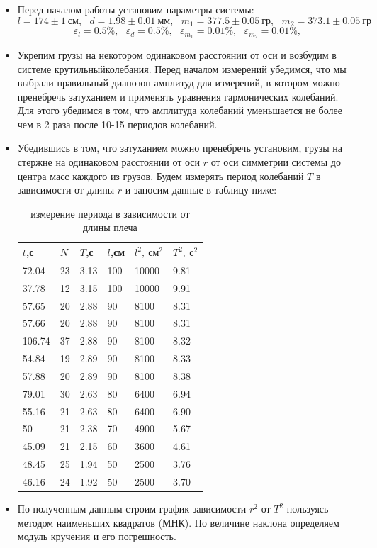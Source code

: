 \documentclass[a4paper,12pt]{article} %
\begin{document}
\begin{itemize}
    \item Перед началом работы установим параметры системы:
$$l=174 \pm 1 \ \text{см},\ \ \ d = 1.98 \pm 0.01 \ \text{мм}, \ \ \ m_1=377.5 \pm 0.05 \ \text{гр}, \ \ \ m_2= 373.1 \pm 0.05 \ \text{гр} $$
$$\varepsilon_{l}=0.5 \%, \ \ \ \varepsilon_{d}= 0.5 \%,\ \ \ \varepsilon_{m_1}=0.01 \%,\ \ \ \varepsilon_{m_2}= 0.01\%,$$
    \item Укрепим грузы на некотором одинаковом расстоянии от оси и возбудим в системе крутильныйколебания. Перед 
началом измерений убедимся, что мы выбрали правильный диапозон амплитуд для измерений,
в котором можно пренебречь затуханием и применять уравнения гармонических колебаний. Для 
этого убедимся в том, что амплитуда колебаний уменьшается не более чем в 2 раза после 10-15 периодов
колебаний.
    \item Убедившись в том, что затуханием можно пренебречь установим, грузы на стержне на одинаковом расстоянии от оси $r$
от оси симметрии системы до центра масс каждого из грузов. Будем измерять период колебаний $T$ в зависимости
от длины $r$ и заносим данные в таблицу ниже:
\begin{table}[!ht]
    \centering
    \begin{tabular}{llllll}\hline
        $t$,с&$N$&$T$,с&$l$,см&$l^2,\ \text{см}^2$&$T^2,\ \text{с}^2$\\ \hline
        72.04 & 23 & 3.13 & 100 & 10000 & 9.81  \\ 
        37.78 & 12 & 3.15 & 100 & 10000 & 9.91  \\ \hline
        57.65 & 20 & 2.88 & 90 & 8100 & 8.31  \\ 
        57.66 & 20 & 2.88 & 90 & 8100 & 8.31  \\ 
        106.74 & 37 & 2.88 & 90 & 8100 & 8.32  \\ 
        54.84 & 19 & 2.89 & 90 & 8100 & 8.33  \\ 
        57.88 & 20 & 2.89 & 90 & 8100 & 8.38  \\ \hline
        79.01 & 30 & 2.63 & 80 & 6400 & 6.94  \\ 
        55.16 & 21 & 2.63 & 80 & 6400 & 6.90  \\ \hline
        50 & 21 & 2.38 & 70 & 4900 & 5.67  \\ \hline
        45.09 & 21 & 2.15 & 60 & 3600 & 4.61  \\ \hline
        48.45 & 25 & 1.94 & 50 & 2500 & 3.76  \\
        46.16 & 24 & 1.92 & 50 & 2500 & 3.70  \\ \hline
    \end{tabular}
    \caption{измерение периода в зависимости от длины плеча}
\end{table}
    \item По полученным данным строим график зависимости $r^2$ от $T^2$ пользуясь
 методом наименьших квадратов (МНК). По величине наклона определяем модуль кручения и его погрешность.


\end{itemize}
\end{document}
